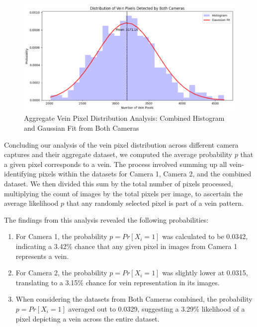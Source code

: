 \begin{enumerate}
    \begin{figure}[H]
        \centering
        \includegraphics[width=1\linewidth]{latex-img/distribution_veins_bothcams.png}
        \caption{Aggregate Vein Pixel Distribution Analysis: Combined Histogram and Gaussian Fit from Both Cameras}
        \label{distribution_veins_bothcams}
    \end{figure}

\end{enumerate}

Concluding our analysis of the vein pixel distribution across different camera captures and their aggregate dataset, we computed the average probability \(p\) that a given pixel corresponds to a vein. The process involved summing up all vein-identifying pixels within the datasets for Camera 1, Camera 2, and the combined dataset. We then divided this sum by the total number of pixels processed, multiplying the count of images by the total pixels per image, to ascertain the average likelihood \(p\) that any randomly selected pixel is part of a vein pattern.

The findings from this analysis revealed the following probabilities:
\begin{enumerate}
    \item For Camera 1, the probability \(p = Pr[X_i = 1]\) was calculated to be 0.0342, indicating a 3.42\% chance that any given pixel in images from Camera 1 represents a vein.

    \item For Camera 2, the probability \(p = Pr[X_i = 1]\) was slightly lower at 0.0315, translating to a 3.15\% chance for vein representation in its images.

    \item When considering the datasets from Both Cameras combined, the probability \(p = Pr[X_i = 1]\) averaged out to 0.0329, suggesting a 3.29\% likelihood of a pixel depicting a vein across the entire dataset.
    
\end{enumerate}


